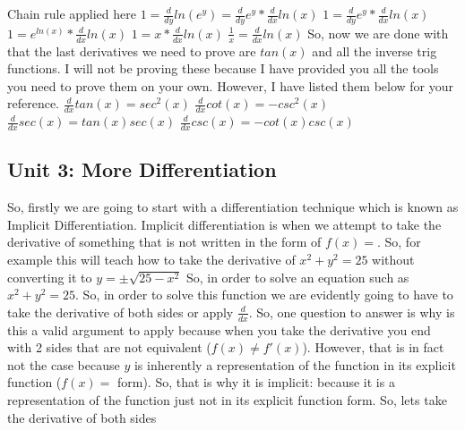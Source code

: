 \documentclass{article}
\begin{document}
Chain rule applied here
\newline
$1 = \frac{d}{dy} ln(e^y) = \frac{d}{dy} e^y * \frac{d}{dx} ln(x)$
\newline
\newline
$1  = \frac{d}{dy} e^y * \frac{d}{dx} ln(x)$
\newline
\newline
$1  = e^{ln(x)} * \frac{d}{dx} ln(x)$
\newline
\newline
$1  = x * \frac{d}{dx} ln(x)$
\newline
\newline
$\frac{1}{x}  = \frac{d}{dx} ln(x)$
\newline
\newline
So, now we are done with that the last derivatives we need to prove are $tan(x)$ and all the inverse trig functions. I will not be proving these because I have provided you all the tools you need to prove them on your own. However, I have listed them below for your reference.
\newline
\newline
$\frac{d}{dx} tan(x) = sec^2(x)$
\newline
$\frac{d}{dx} cot(x) = -csc^2(x)$
\newline
$\frac{d}{dx} sec(x) = tan(x)sec(x)$
\newline
$\frac{d}{dx} csc(x) = -cot(x)csc(x)$
\newpage
\begin{center}
    \section{Unit 3: More Differentiation}
\end{center}
So, firstly we are going to start with a differentiation technique which is known as Implicit Differentiation. Implicit differentiation is when we attempt to take the derivative of something that is not written in the form of $f(x) = $. So, for example this will teach how to take the derivative of $x^2+y^2=25$ without converting it to $y =  \pm \sqrt{25-x^2}$
\newline
\newline
So, in order to solve an equation such as $x^2+y^2=25$. So, in order to solve this function we are evidently going to have to take the derivative of both sides or apply $\frac{d}{dx}$. So, one question to answer is why is this a valid argument to apply because when you take the derivative you end with 2 sides that are not equivalent ($f(x) \neq f'(x)$). However, that is in fact not the case because $y$ is inherently a representation of the function in its explicit function ($f(x) =$ form). So, that is why it is implicit: because it is a representation of the function just not in its explicit function form. So, lets take the derivative of both sides
\end{document}
